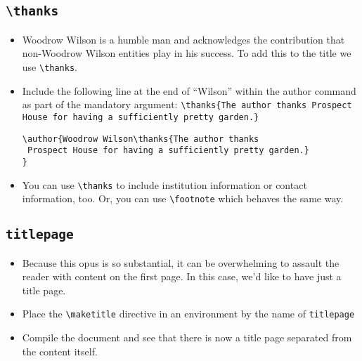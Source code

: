 \subsection*{\texttt{\textbackslash{}thanks}}
\begin{itemize}
\item Woodrow Wilson is a humble man and acknowledges the contribution that
  non-Woodrow Wilson entities play in his success. To add this to the title we
  use \texttt{\textbackslash{}thanks}.

\item Include the following line at the end of ``Wilson'' within the author
  command as part of the mandatory argument: \texttt{\textbackslash{}thanks\{The
    author thanks Prospect House for having a sufficiently pretty garden.\}}

\begin{center}
  \begin{minipage}{.8\linewidth}
    \begin{framed}
\begin{verbatim}
\author{Woodrow Wilson\thanks{The author thanks
 Prospect House for having a sufficiently pretty garden.}
}
\end{verbatim}
    \end{framed}
  \end{minipage}
\end{center}

\item You can use \verb=\thanks= to include institution information or contact
  information, too. Or, you can use \verb=\footnote= which behaves the same way.

\end{itemize}


\subsection*{\texttt{titlepage}}

\begin{itemize}

\item Because this opus is so substantial, it can be overwhelming to
  assault the reader with content on the first page. In this case,
  we'd like to have just a title page.

\item Place the \verb=\maketitle= directive in an environment by the name of
  \texttt{titlepage}

\item Compile the document and see that there is now a title page separated from
  the content itself.

\end{itemize}

